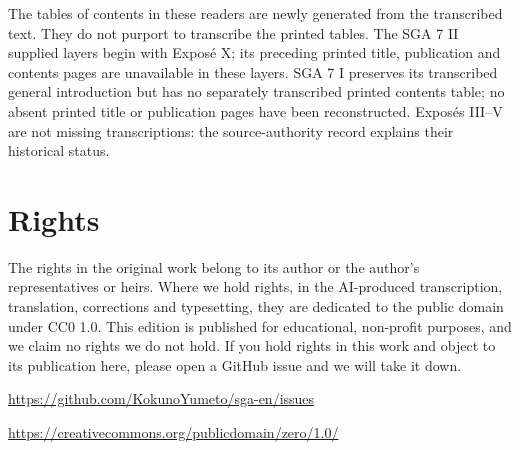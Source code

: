 The tables of contents in these readers are newly generated from the transcribed text. They do not purport to transcribe the printed tables. The SGA 7 II supplied layers begin with Exposé X; its preceding printed title, publication and contents pages are unavailable in these layers. SGA 7 I preserves its transcribed general introduction but has no separately transcribed printed contents table; no absent printed title or publication pages have been reconstructed. Exposés III–V are not missing transcriptions: the source-authority record explains their historical status.

\section*{Rights}

The rights in the original work belong to its author or the author's representatives or heirs. Where we hold rights, in the AI-produced transcription, translation, corrections and typesetting, they are dedicated to the public domain under CC0 1.0. This edition is published for educational, non-profit purposes, and we claim no rights we do not hold. If you hold rights in this work and object to its publication here, please open a GitHub issue and we will take it down.

\par\noindent\url{https://github.com/KokunoYumeto/sga-en/issues}

\par\noindent\url{https://creativecommons.org/publicdomain/zero/1.0/}

\clearpage
